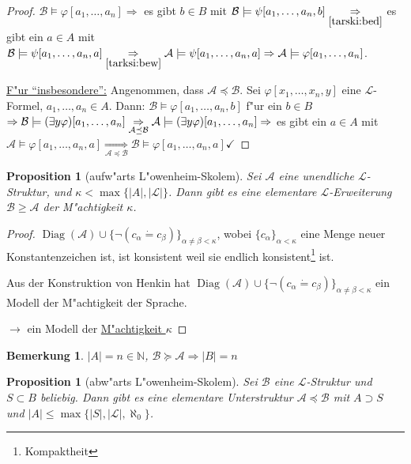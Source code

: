 \documentclass[a4paper,12pt,numbers=noenddot,parskip=full]{scrartcl}
\newcommand{\setN}{\mathbb{N}}
\newcommand{\scrL}{\mathcal{L}}
\newcommand{\scrA}{\mathcal{A}}
\newcommand{\scrB}{\mathcal{B}}
\DeclareMathOperator{\Diag}{Diag}
\newcommand{\vdig}{\Diag}
\theoremstyle{dotless}
\newtheorem{proposition}[theorem]{Proposition}
\newtheorem{remark}[theorem]{Bemerkung}
\begin{document}
\begin{proof}
	$\scrB \models \varphi[a_1, \dots, a_n] \Rightarrow$ es gibt $b \in B$ mit $\scrB \models \psi[a_1, \dots, a_n, b] \underset{\ref{tarski:bed}}{\Rightarrow}$ es gibt ein $a \in A$ mit $\scrB \models \psi[a_1, \dots, a_n, a] \underset{\ref{tarksi:bew}}{\Rightarrow} \scrA \models \psi[a_1, \dots, a_n, a] \Rightarrow \scrA \models \varphi[a_1, \dots, a_n]$.
	
	\underline{F"ur "`insbesondere"':} Angenommen, dass $\scrA \preceq \scrB$. Sei $\varphi[x_1, \dots, x_n, y]$ eine $\scrL$-Formel, $a_1, \dots, a_n \in A$. Dann: $\scrB \models \varphi[a_1, \dots, a_n, b]$ f"ur ein $b \in B$ $\Rightarrow \scrB \models (\exists y \varphi)[a_1, \dots, a_n] \\
	\underset{\scrA \preceq \scrB}{\Rightarrow} \scrA \models (\exists y \varphi)[a_1, \dots, a_n] \Rightarrow$ es gibt ein $a \in A$ mit $\scrA \models \varphi[a_1, \dots, a_n, a] {\underset{\scrA \preceq \scrB}{\Rightarrow} \scrB \models \varphi[a_1, \dots, a_n, a]} \checkmark$
\end{proof}

\begin{proposition}[aufw"arts L"owenheim-Skolem]
	Sei $\scrA$ eine unendliche $\scrL$-Struktur, und $\kappa < \max\{|A|,|\scrL|\}$. Dann gibt es eine elementare $\scrL$-Erweiterung $\scrB \geq \scrA$ der M"achtigkeit $\kappa$.
\end{proposition}
\begin{proof}
	$\vdig(\scrA) \cup \{\lnot(c_\alpha \dot= c_\beta)\}_{\alpha \neq \beta < \kappa}$, wobei $\{c_\alpha\}_{\alpha<\kappa}$ eine Menge neuer Konstantenzeichen ist, ist konsistent weil sie endlich konsistent\footnote{Kompaktheit} ist.
	
	Aus der Konstruktion von Henkin hat $\vdig(\scrA) \cup \{\lnot(c_\alpha \dot= c_\beta)\}_{\alpha \neq \beta < \kappa}$ ein Modell der M"achtigkeit der Sprache.
	
	$\rightarrow$ ein Modell der \underline{M"achtigkeit $\kappa$}
\end{proof}

\begin{remark}
	$|A| = n \in \setN$, $\scrB \succeq \scrA \Rightarrow |B| = n$
\end{remark}

\begin{proposition}[abw"arts L"owenheim-Skolem]\label{Low:ab}
	Sei $\scrB$ eine $\scrL$-Struktur und $S \subset B$ beliebig. Dann gibt es eine elementare Unterstruktur $\scrA \preceq \scrB$ mit $A \supset S$ und $|A|\leq \max\{|S|,|\scrL|,\aleph_0\}$.
\end{proposition}
\end{document}
